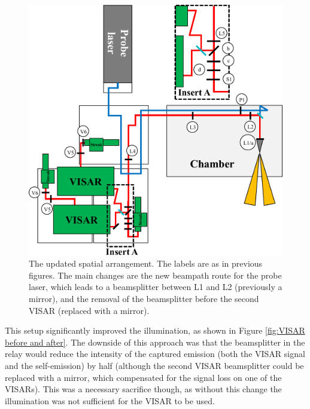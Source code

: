 \begin{figure}
\begin{centering}
\includegraphics[width=1.0\textwidth]{figures/Experiment/FinalSetup.pdf}%
\caption{\label{fig:Full setup} The updated spatial arrangement. The labels are as in previous figures. The main changes are the new beampath route for the probe laser, which leads to a beamsplitter between L1 and L2 (previously a mirror), and the removal of the beamsplitter before the second VISAR (replaced with a mirror).}
\end{centering}
\end{figure}

This setup significantly improved the illumination, as shown in Figure \ref{fig:VISAR before and after}. The downside of this approach was that the beamsplitter in the relay would reduce the intensity of the captured emission (both the VISAR signal and the self-emission) by half (although the second VISAR beamsplitter could be replaced with a mirror, which compensated for the signal loss on one of the VISARs). This was a necessary sacrifice though, as without this change the illumination was not sufficient for the VISAR to be used.

